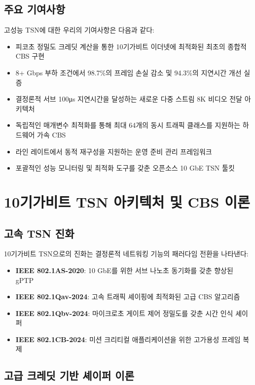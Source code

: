 \documentclass[12pt, a4paper]{article}
\begin{document}
\subsection{주요 기여사항}

고성능 TSN에 대한 우리의 기여사항은 다음과 같다:

\begin{itemize}
    \item 피코초 정밀도 크레딧 계산을 통한 10기가비트 이더넷에 최적화된 최초의 종합적 CBS 구현
    \item 8+ Gbps 부하 조건에서 98.7\%의 프레임 손실 감소 및 94.3\%의 지연시간 개선 실증
    \item 결정론적 서브 100μs 지연시간을 달성하는 새로운 다중 스트림 8K 비디오 전달 아키텍처
    \item 독립적인 매개변수 최적화를 통해 최대 64개의 동시 트래픽 클래스를 지원하는 하드웨어 가속 CBS
    \item 라인 레이트에서 동적 재구성을 지원하는 운영 준비 관리 프레임워크
    \item 포괄적인 성능 모니터링 및 최적화 도구를 갖춘 오픈소스 10 GbE TSN 툴킷
\end{itemize}

\section{10기가비트 TSN 아키텍처 및 CBS 이론}

\subsection{고속 TSN 진화}

10기가비트 TSN으로의 진화는 결정론적 네트워킹 기능의 패러다임 전환을 나타낸다:

\begin{itemize}
    \item \textbf{IEEE 802.1AS-2020}: 10 GbE를 위한 서브 나노초 동기화를 갖춘 향상된 gPTP
    \item \textbf{IEEE 802.1Qav-2024}: 고속 트래픽 셰이핑에 최적화된 고급 CBS 알고리즘
    \item \textbf{IEEE 802.1Qbv-2024}: 마이크로초 게이트 제어 정밀도를 갖춘 시간 인식 셰이퍼
    \item \textbf{IEEE 802.1CB-2024}: 미션 크리티컬 애플리케이션을 위한 고가용성 프레임 복제
\end{itemize}

\subsection{고급 크레딧 기반 셰이퍼 이론}
\end{document}
